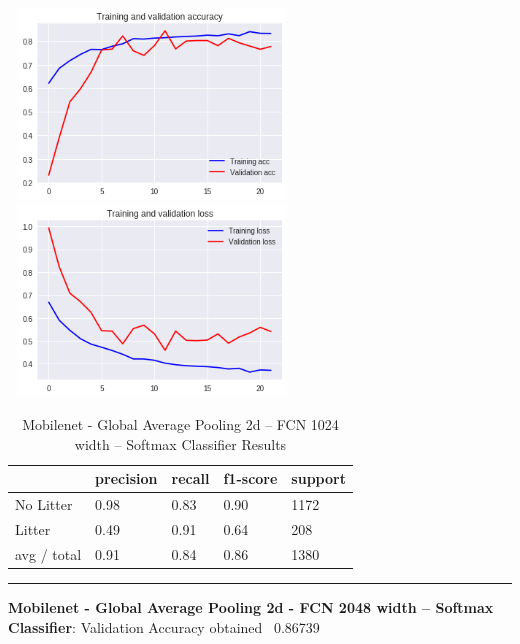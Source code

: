 \documentclass{IEEEtran}
\begin{document}
 \includegraphics[width=3in,height=2in]{mobilenet-img/mobilenet-img005.png} 
\includegraphics[width=3in,height=2in]{mobilenet-img/mobilenet-img006.png} 


\bigskip

\begin{table}[ht]
\centering
\caption{Mobilenet - Global Average Pooling 2d -- FCN 1024 width -- Softmax Classifier Results}
\begin{tabular}{|l|l|l|l|l|} 
\hline
 & precision & recall  & f1-score  & support \\\hline
No Litter &
0.98 &
0.83 &
0.90 &
1172 \\\hline
Litter &
0.49 &
0.91 &
0.64 &
208 \\\hline
avg / total &
0.91 &
0.84 &
0.86 &
1380\\\hline
\end{tabular}
\end{table}

\begin{center}\noindent\rule{8cm}{0.4pt}\end{center}

\textbf{Mobilenet - Global Average Pooling 2d - FCN 2048 width -- Softmax Classifier}: Validation Accuracy obtained \ 0.86739
\end{document}
